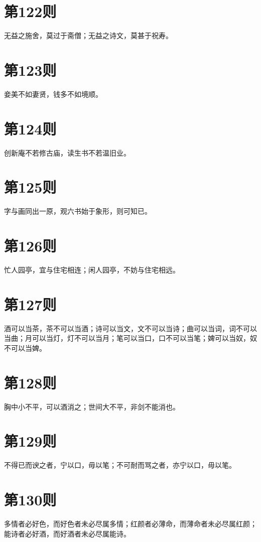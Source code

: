 \documentclass[12pt,a4paper]{ctexbook}
\begin{document}
\section{第122则}
无益之施舍，莫过于斋僧；无益之诗文，莫甚于祝寿。\par

\section{第123则}
妾美不如妻贤，钱多不如境顺。\par

\section{第124则}
创新庵不若修古庙，读生书不若温旧业。\par

\section{第125则}
字与画同出一原，观六书始于象形，则可知已。\par

\section{第126则}
忙人园亭，宜与住宅相连；闲人园亭，不妨与住宅相远。\par

\section{第127则}
酒可以当茶，茶不可以当酒；诗可以当文，文不可以当诗；曲可以当词，词不可以当曲；月可以当灯，灯不可以当月；笔可以当口，口不可以当笔；婢可以当奴，奴不可以当婢。\par

\section{第128则}
胸中小不平，可以酒消之；世间大不平，非剑不能消也。\par

\section{第129则}
不得已而谀之者，宁以口，毋以笔；不可耐而骂之者，亦宁以口，毋以笔。\par

\section{第130则}
多情者必好色，而好色者未必尽属多情；红颜者必薄命，而薄命者未必尽属红颜；能诗者必好酒，而好酒者未必尽属能诗。\par
\end{document}
